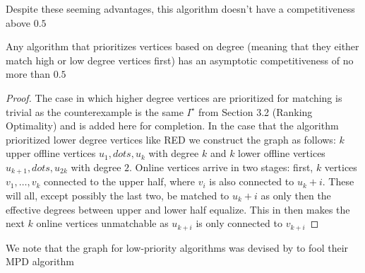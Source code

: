 Despite these seeming advantages, this algorithm doesn't have a competitiveness above $0.5$
\begin{theorem}
	Any algorithm that prioritizes vertices based on degree (meaning that they either match high or low degree vertices first) has an asymptotic competitiveness of no more than $0.5$
\end{theorem}
\begin{figure}[H]
	\centering
	
\end{figure}
\begin{proof}
	The case in which higher degree vertices are prioritized for matching is trivial as the counterexample is the same $I^\star$ from Section 3.2 (Ranking Optimality) and is added here for completion. In the case that the algorithm prioritized lower degree vertices like RED we construct the graph as follows: $k$ upper offline vertices $u_1,dots,u_k$ with degree $k$ and $k$ lower offline vertices $u_{k+1},dots,u_{2k}$ with degree $2$. Online vertices arrive in two stages: first, $k$ vertices $v_1,\dots,v_k$ connected to the upper half, where $v_i$ is also connected to $u_k+i$. These will all, except possibly the last two, be matched to $u_k+i$ as only then the effective degrees between upper and lower half equalize. This in then makes the next $k$ online vertices unmatchable as $u_{k+i}$ is only connected to $v_{k+i}$
\end{proof}
We note that the graph for low-priority algorithms was devised by \cite{obmRaRank} to fool their MPD algorithm